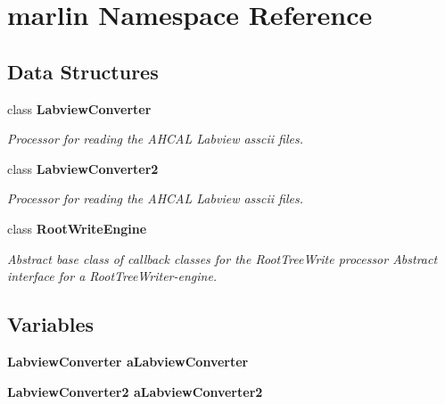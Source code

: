 \section{marlin Namespace Reference}
\label{namespacemarlin}


\subsection*{Data Structures}
\begin{CompactItemize}
\item 
class \bf{Labview\-Converter}
\begin{CompactList}\small\item\em Processor for reading the AHCAL Labview asscii files. \item\end{CompactList}\item 
class \bf{Labview\-Converter2}
\begin{CompactList}\small\item\em Processor for reading the AHCAL Labview asscii files. \item\end{CompactList}\item 
class \bf{Root\-Write\-Engine}
\begin{CompactList}\small\item\em Abstract base class of callback classes for the Root\-Tree\-Write processor Abstract interface for a Root\-Tree\-Writer-engine. \item\end{CompactList}\end{CompactItemize}
\subsection*{Variables}
\begin{CompactItemize}
\item 
\bf{Labview\-Converter} \bf{a\-Labview\-Converter}\label{namespacemarlin_1b31a5709b7c22967f3cb50ba63a7b98}

\item 
\bf{Labview\-Converter2} \bf{a\-Labview\-Converter2}\label{namespacemarlin_a29cb1a3c92dfa6b1328e4398702d2bf}

\end{CompactItemize}
